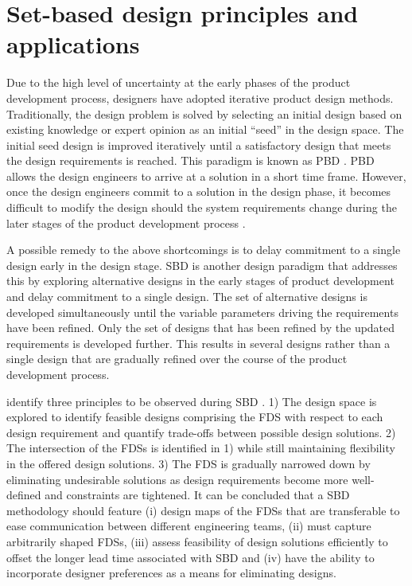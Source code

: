 \section{Set-based design principles and applications} 
\label{sec:SBD}

Due to the high level of uncertainty at the early phases of the product development process, designers have adopted iterative product design methods. Traditionally, the design problem is solved by selecting an initial design based on existing knowledge or expert opinion as an initial ``seed'' in the design space. The initial seed design is improved iteratively until a satisfactory design that meets the design requirements is reached. This paradigm is known as \ac{PBD} \cite{Qureshi2014, Kerga2014, SobekIi1999}. \ac{PBD} allows the design engineers to arrive at a solution in a short time frame. However, once the design engineers commit to a solution in the design phase, it becomes difficult to modify the design should the system requirements change during the later stages of the product development process \cite{Levandowski2014a, Carlson2000a}.

A possible remedy to the above shortcomings is to delay commitment to a single design early in the design stage. \ac{SBD} is another design paradigm that addresses this by exploring alternative designs in the early stages of product development and delay commitment to a single design. The set of alternative designs is developed simultaneously until the variable parameters driving the requirements have been refined. Only the set of designs that has been refined by the updated requirements is developed further. This results in several designs rather than a single design that are gradually refined over the course of the product development process.

\citeauthor{SobekIi1999} identify three principles to be observed during \ac{SBD} \cite{SobekIi1999}. 1) The design space is explored to identify feasible designs comprising the \ac{FDS} with respect to each design requirement and quantify trade-offs between possible design solutions. 2) The intersection of the \acp{FDS} is identified in 1) while still maintaining flexibility in the offered design solutions. 3) The \ac{FDS} is gradually narrowed down by eliminating undesirable solutions as design requirements become more well-defined and constraints are tightened. It can be concluded that a \ac{SBD} methodology should feature (i) design maps of the \acp{FDS} that are transferable to ease communication between different engineering teams, (ii) must capture arbitrarily shaped \acp{FDS}, (iii) assess feasibility of design solutions efficiently to offset the longer lead time associated with \ac{SBD} and (iv) have the ability to incorporate designer preferences as a means for eliminating designs.


